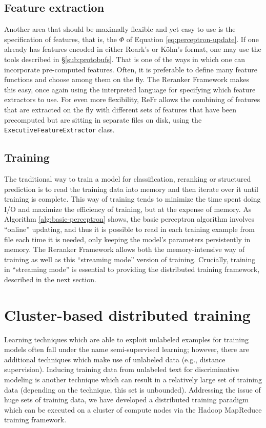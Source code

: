 \documentclass[a4paper]{article}
\begin{document}
\subsection{Feature extraction}

Another area that should be maximally flexible and yet easy to use
is the specification of features, that is, the $\Phi$ of Equation
\ref{eq:perceptron-update}. If one already has features encoded in
either Roark's or K\"{o}hn's format, one may use the tools described in
\S\ref{sub:protobufs}. That is one of the ways in which one can
incorporate pre-computed features. Often, it is preferable to define
many feature functions and choose among them on the fly. The Reranker
Framework makes this easy, once again using the interpreted language
for specifying which feature extractors to use.
For even more flexibility, ReFr allows the combining of features that
are extracted on the fly with different sets of features that have
been precomputed but are sitting in separate files on disk, using the \texttt{ExecutiveFeatureExtractor} class.


\subsection{Training}

The traditional way to train a model for classification, reranking
or structured prediction is to read the training data into memory
and then iterate over it until training is complete. This way of training
tends to minimize the time spent doing I/O and maximize the efficiency
of training, but at the expense of memory. As Algorithm \ref{alg:basic-perceptron}
shows, the basic perceptron algorithm involves ``online'' updating,
and thus it is possible to read in each training example from file
each time it is needed, only keeping the model's parameters persistently
in memory. The Reranker Framework allows both the memory-intensive
way of training as well as this ``streaming mode'' version of training.
Crucially, training in ``streaming mode'' is essential to providing
the distributed training framework, described in the next section.


\section{Cluster-based distributed training}

Learning techniques which are able to exploit unlabeled examples for
training models often fall under the name semi-supervised learning;
however, there are additional techniques which make use of unlabeled
data (e.g., distance supervision\cite{mintz09}). Inducing training
data from unlabeled text for discriminative modeling is another technique which
can result in a relatively large set of training data (depending on the
technique, this set is unbounded). Addressing the issue of huge sets of training
data, we have developed a distributed training paradigm which can be executed on
a cluster of compute nodes via the Hadoop MapReduce training framework.
\end{document}

